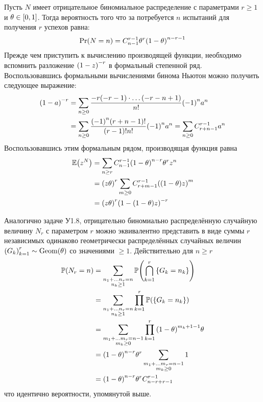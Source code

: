 \documentclass[a4paper]{article}
\let\originalleft\left
\let\originalright\right
\renewcommand{\left}{\mathopen{}\mathclose\bgroup\originalleft}
\renewcommand{\right}{\aftergroup\egroup\originalright}
\newcommand{\obj}[1]{{\left\{ #1 \right \}}}
\newcommand{\clo}[1]{{\left [ #1 \right ]}}
\newcommand{\brac}[1]{{\left ( #1 \right )}}
\newcommand{\Ex}[0]{{\mathbb{E}}}
\newcommand{\pr}[0]{{\mathbb{P}}}
\begin{document}
Пусть $N$ имеет отрицательное биномиальное распределение с параметрами $r\geq1$
и $\theta\in \clo{0,1}$.
Тогда вероятность того что за потребуется $n$ испытаний для получения $r$
успехов равна:
\[\Pr(N=n) = C^{r-1}_{n-1} \theta^r \brac{1-\theta}^{n-r-1}\]
Прежде чем приступить к вычислению производящей функции, необходимо вспомнить
разложение $\brac{1-z}^{-r}$ в формальный степенной ряд. Воспользовавшись
формальными вычислениями бинома Ньютон можно получить следующее выражение:
\begin{align*}
\brac{1-a}^{-r} &= \sum_{n\geq 0} \frac{-r(-r-1)\cdot\ldots(-r-n+1)}{n!} \brac{-1}^n a^n \\
	&= \sum_{n\geq 0} \frac{{(-1)}^n (r+n-1)!}{(r-1)!n!} \brac{-1}^n a^n
	= \sum_{n\geq 0} C^{r-1}_{r+n-1} a^n
\end{align*}
Воспользовавшись этим формальным рядом, производящая функция равна
\begin{align*}
	\Ex\brac{z^N} &= \sum_{n\geq r} C^{r-1}_{n-1} \brac{1-\theta}^{n-r} \theta^r z^n \\
	&= {(z \theta)}^r \sum_{m\geq 0} C^{r-1}_{r+m-1} \brac{(1-\theta)z}^m \\
	&= {(z \theta)}^r \brac{1 - (1-\theta)z}^{-r} 
\end{align*}

Аналогично задаче У1.8, отрицательно биномиально распределённую случайную
величину $N_r$ с параметром $r$ можно эквивалентно представить в виде суммы
$r$ независимых одинаково геометрически распределённых случайных величин
$\brac{G_k}_{k=1}^r\sim \text{Geom}(\theta)$ со значениями $\geq1$.
Действительно для $n\geq r$ \begin{align*}
	\pr\brac{N_r = n} &= \sum_{\substack{n_1 + \ldots n_r = n \\ n_k\geq1}} \pr\brac{\bigcap_{k=1}^r \obj{G_k = n_k}} \\
	&= \sum_{\substack{n_1 + \ldots n_r = n \\ n_k\geq1}} \prod_{k=1}^r \pr\brac{\obj{G_k = n_k}} \\
	&= \sum_{\substack{m_1 + \ldots m_r = n-1 \\ m_k\geq0}} \prod_{k=1}^r {(1-\theta)}^{m_k+1-1} \theta \\
	&= {(1-\theta)}^{n-r} \theta^r \sum_{\substack{m_1 + \ldots m_r = n-1 \\ m_k\geq0}} 1\\
	&= {(1-\theta)}^{n-r} \theta^r C^{r-1}_{n-r+r-1}\\
\end{align*}
что идентично вероятности, упомянутой выше.
\end{document}
